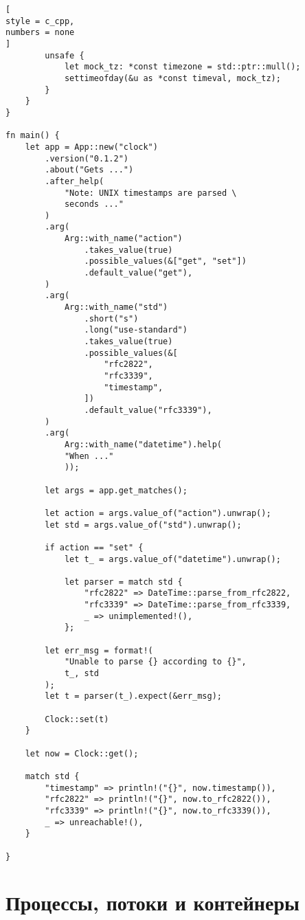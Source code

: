 \documentclass[%
	11pt,
	a4paper,
	utf8,
		]{article}
\begin{document}
\begin{lstlisting}[
style = c_cpp,
numbers = none	
]
        unsafe {
            let mock_tz: *const timezone = std::ptr::mull();
            settimeofday(&u as *const timeval, mock_tz);
        }
    }
}

fn main() {
    let app = App::new("clock")
        .version("0.1.2")
        .about("Gets ...")
        .after_help(
            "Note: UNIX timestamps are parsed \
            seconds ..."
        )
        .arg(
            Arg::with_name("action")
                .takes_value(true)
                .possible_values(&["get", "set"])
                .default_value("get"),
        )
        .arg(
            Arg::with_name("std")
                .short("s")
                .long("use-standard")
                .takes_value(true)
                .possible_values(&[
                    "rfc2822",
                    "rfc3339",
                    "timestamp",
                ])
                .default_value("rfc3339"),
        )
        .arg(
            Arg::with_name("datetime").help(
            "When ..."
            ));
        
        let args = app.get_matches();
        
        let action = args.value_of("action").unwrap();
        let std = args.value_of("std").unwrap();
        
        if action == "set" {
            let t_ = args.value_of("datetime").unwrap();
            
            let parser = match std {
                "rfc2822" => DateTime::parse_from_rfc2822,
                "rfc3339" => DateTime::parse_from_rfc3339,
                _ => unimplemented!(),
            };
        
        let err_msg = format!(
            "Unable to parse {} according to {}",
            t_, std
        );
        let t = parser(t_).expect(&err_msg);
        
        Clock::set(t)
    }
    
    let now = Clock::get();
    
    match std {
        "timestamp" => println!("{}", now.timestamp()),
        "rfc2822" => println!("{}", now.to_rfc2822()),
        "rfc3339" => println!("{}", now.to_rfc3339()),
        _ => unreachable!(),
    }
    
}
\end{lstlisting}

\section{Процессы, потоки и контейнеры}
\end{document}
